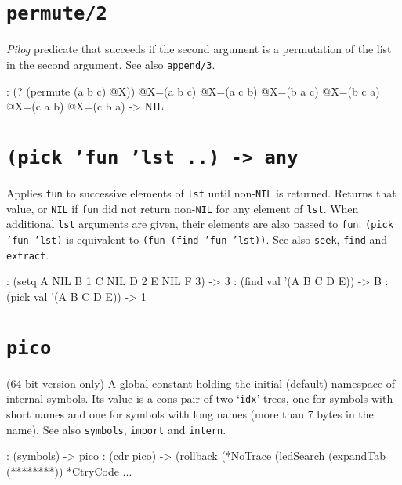  
\section*{\texttt{permute/2}}
\label{sec:func-ref-P-permute/2}


\emph{Pilog} predicate that succeeds if the second argument
is a permutation of the list in the second argument. See also
\texttt{append/3}.


\begin{wideverbatim}
: (? (permute (a b c) @X))
 @X=(a b c)
 @X=(a c b)
 @X=(b a c)
 @X=(b c a)
 @X=(c a b)
 @X=(c b a)
-> NIL
\end{wideverbatim}

 
\section*{\texttt{(pick 'fun 'lst ..) -> any}}
\label{sec:func-ref-P-(pick 'fun 'lst ..) -> any}


Applies \texttt{fun} to successive elements of \texttt{lst} until non-\texttt{NIL} is
returned. Returns that value, or \texttt{NIL} if \texttt{fun} did not return non-\texttt{NIL}
for any element of \texttt{lst}. When additional \texttt{lst} arguments are given,
their elements are also passed to \texttt{fun}. \texttt{(pick 'fun 'lst)} is
equivalent to \texttt{(fun (find 'fun 'lst))}. See also \texttt{seek}, \texttt{find} and
\texttt{extract}.


\begin{wideverbatim}
: (setq A NIL  B 1  C NIL  D 2  E NIL  F 3)
-> 3
: (find val '(A B C D E))
-> B
: (pick val '(A B C D E))
-> 1
\end{wideverbatim}

 
\section*{\texttt{pico}}
\label{sec:func-ref-P-pico}


(64-bit version only) A global constant holding the initial (default)
namespace of internal symbols. Its value is a cons pair of two `\texttt{idx}'
trees, one for symbols with short names and one for symbols with long
names (more than 7 bytes in the name). See also \texttt{symbols}, \texttt{import} and
\texttt{intern}.


\begin{wideverbatim}
: (symbols)
-> pico
: (cdr pico)
-> (rollback (*NoTrace (ledSearch (expandTab (********)) *CtryCode ...
\end{wideverbatim}

